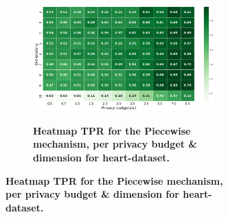 \begin{figure}[H]
\begin{subfigure}[b]{0.9\textwidth}
        \begin{subfigure}[c]{1\textwidth}
            \caption{\textbf{Heatmap TPR for the Piecewise mechanism, per privacy budget \& dimension for heart-dataset.}}
            \includegraphics[width=1\textwidth]{Results/kd-laplace/piecewise/heart-dataset/tpr.png}
            \label{fig:privacy_tpr_heart-dataset_adversial_advantage_piecewise}
        \end{subfigure}
    \end{subfigure}
    \hfill %
    \begin{subfigure}[b]{0.075\textwidth}

\end{subfigure}
\end{figure}
